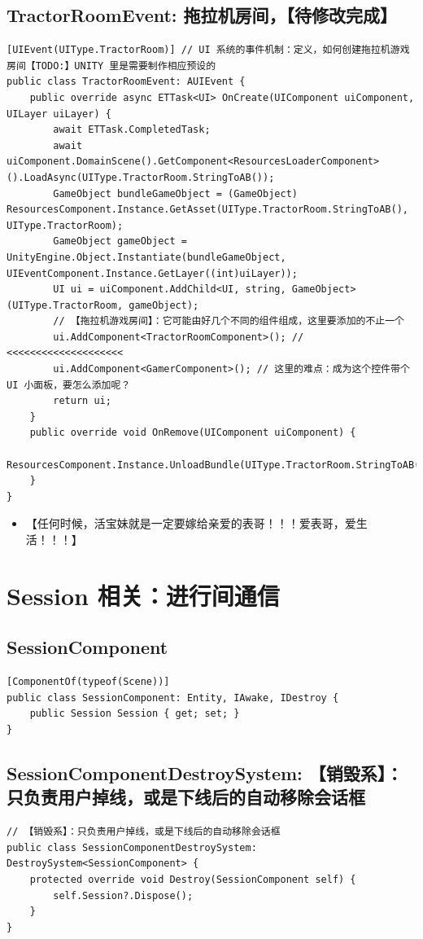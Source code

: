 \documentclass[9pt, b5paper]{article}
\begin{document}
\subsection{TractorRoomEvent: 拖拉机房间，【待修改完成】}
\label{sec-7-12}
\begin{verbatim}
[UIEvent(UIType.TractorRoom)] // UI 系统的事件机制：定义，如何创建拖拉机游戏房间【TODO:】UNITY 里是需要制作相应预设的
public class TractorRoomEvent: AUIEvent {
    public override async ETTask<UI> OnCreate(UIComponent uiComponent, UILayer uiLayer) {
        await ETTask.CompletedTask;
        await uiComponent.DomainScene().GetComponent<ResourcesLoaderComponent>().LoadAsync(UIType.TractorRoom.StringToAB());
        GameObject bundleGameObject = (GameObject) ResourcesComponent.Instance.GetAsset(UIType.TractorRoom.StringToAB(), UIType.TractorRoom);
        GameObject gameObject = UnityEngine.Object.Instantiate(bundleGameObject, UIEventComponent.Instance.GetLayer((int)uiLayer));
        UI ui = uiComponent.AddChild<UI, string, GameObject>(UIType.TractorRoom, gameObject);
        // 【拖拉机游戏房间】：它可能由好几个不同的组件组成，这里要添加的不止一个
        ui.AddComponent<TractorRoomComponent>(); // <<<<<<<<<<<<<<<<<<<< 
        ui.AddComponent<GamerComponent>(); // 这里的难点：成为这个控件带个UI 小面板，要怎么添加呢？
        return ui;
    }
    public override void OnRemove(UIComponent uiComponent) {
        ResourcesComponent.Instance.UnloadBundle(UIType.TractorRoom.StringToAB());
    }
}
\end{verbatim}
\begin{itemize}
\item 【任何时候，活宝妹就是一定要嫁给亲爱的表哥！！！爱表哥，爱生活！！！】
\end{itemize}


\section{Session 相关：进行间通信}
\label{sec-8}
\subsection{SessionComponent}
\label{sec-8-1}
\begin{verbatim}
[ComponentOf(typeof(Scene))]
public class SessionComponent: Entity, IAwake, IDestroy {
    public Session Session { get; set; }
}
\end{verbatim}
\subsection{SessionComponentDestroySystem: 【销毁系】：只负责用户掉线，或是下线后的自动移除会话框}
\label{sec-8-2}
\begin{verbatim}
// 【销毁系】：只负责用户掉线，或是下线后的自动移除会话框 
public class SessionComponentDestroySystem: DestroySystem<SessionComponent> {
    protected override void Destroy(SessionComponent self) {
        self.Session?.Dispose();
    }
}
\end{verbatim}
\end{document}
